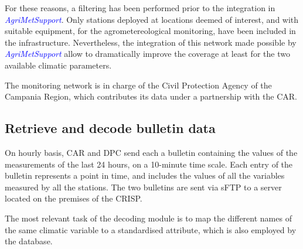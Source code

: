\documentclass[authoryear,preprint,review,12pt]{elsarticle}
\newcommand{\update}[1]{\emph{\textcolor{blue}{#1}}}
\newcommand{\review}[1]{\emph{\textcolor{cyan}{#1}}}
\newcommand{\gci}{\update{AgriMetSupport}\xspace}
\begin{document}
For these reasons, a filtering has been performed prior to the integration in \gci.
Only stations deployed at locations deemed of interest, and with suitable equipment, for the agrometereological monitoring, have been included in the infrastructure.
Nevertheless, the integration of this network made possible by \gci allow to dramatically improve the coverage at least for the two available climatic parameters.

The monitoring network is in charge of the Civil Protection Agency of the Campania Region, which contributes its data under a partnership with the CAR.

\subsection{Retrieve and decode bulletin data}
On hourly basis, CAR and DPC send each a bulletin containing the values of the measurements of the last 24 hours, on a 10-minute time scale.
Each entry of the bulletin represents a point in time, and includes the values of all the variables measured by all the stations.
The two bulletins are sent via sFTP to a server located on the premises of the CRISP.

 
 The most relevant task of the decoding module is to map the different names of the same climatic variable to a standardised attribute, which is also employed by the database.

 
\end{document}
